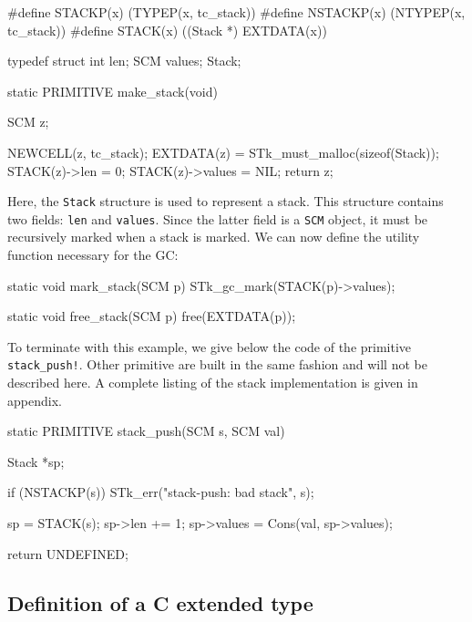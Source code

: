 \documentclass[10pt]{article}
\begin{document}
\begin{Code}
\begin{listing}[200]{2}
#define STACKP(x)       (TYPEP(x, tc_stack))
#define NSTACKP(x)      (NTYPEP(x, tc_stack))
#define STACK(x)        ((Stack *) EXTDATA(x))

typedef struct {
  int len;
  SCM values;
} Stack;
\end{listing}
\end{Code}
\begin{Code}
\begin{listing}[200]{2}
static PRIMITIVE make_stack(void)
{
  SCM z;

  NEWCELL(z, tc_stack);
  EXTDATA(z)       = STk_must_malloc(sizeof(Stack));
  STACK(z)->len    = 0;
  STACK(z)->values = NIL;
  return z;
}
\end{listing}
\end{Code}

Here, the {\tt Stack} structure is used to represent a stack. This
structure contains two fields: {\tt len} and {\tt values}. Since the latter
field is a {\tt SCM} object, it must be recursively marked when a
stack is marked. We can now define the utility function necessary for
the GC:
\begin{Code}
\begin{listing}[200]{2}
static void mark_stack(SCM p)
{
  STk_gc_mark(STACK(p)->values);
}

static void free_stack(SCM p)
{
  free(EXTDATA(p));
}
\end{listing}
\end{Code}

To terminate with this example, we give below the code of the primitive 
{\tt stack\_push!}. Other primitive are built in the same fashion and
will not be described here. A complete listing of the stack
implementation is given in appendix.
\begin{Code}
\begin{listing}[200]{2}
static PRIMITIVE stack_push(SCM s, SCM val)
{
  Stack *sp;

  if (NSTACKP(s)) STk_err("stack-push: bad stack", s);

  sp         =  STACK(s);
  sp->len   += 1;
  sp->values = Cons(val, sp->values);
  
  return UNDEFINED;
}
\end{listing}
\end{Code}

\subsection{Definition of a C extended type}
\end{document}
